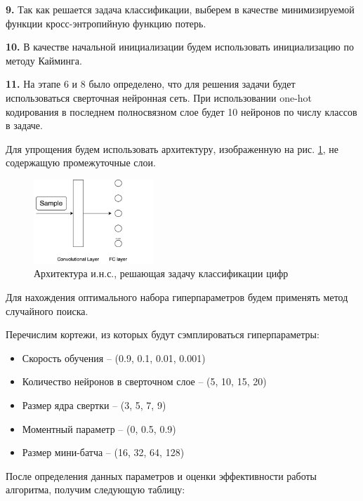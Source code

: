 				\textbf{9.} Так как решается задача классификации, выберем в качестве минимизируемой функции кросс-энтропийную функцию потерь.
				
				\textbf{10.} В качестве начальной инициализации будем использовать инициализацию по методу Кайминга.
				
				\textbf{11.} На этапе 6 и 8 было определено, что для решения задачи будет использоваться сверточная нейронная сеть. При использовании one-hot кодирования в последнем полносвязном слое будет 10 нейронов по числу классов в задаче.
				
				Для упрощения будем использовать архитектуру, изображенную на рис. \ref{fig:model}, не содержащую промежуточные слои.
				
				\begin{figure}[h]
					\centering
					\includegraphics[width=0.4\textwidth]{figures/model.png}
					\caption{Архитектура и.н.с., решающая задачу классификации цифр}
					\label{fig:model}
				\end{figure}
				
				Для нахождения оптимального набора гиперпараметров будем применять метод случайного поиска.
				
				Перечислим кортежи, из которых будут сэмплироваться гиперпараметры:
				\begin{itemize}
					\item Скорость обучения -- (0.9, 0.1, 0.01, 0.001)
					\item Количество нейронов в сверточном слое -- (5, 10, 15, 20)
					\item Размер ядра свертки -- (3, 5, 7, 9)
					\item Моментный параметр -- (0, 0.5, 0.9)
					\item Размер мини-батча -- (16, 32, 64, 128)
				\end{itemize}
				
				После определения данных параметров и оценки эффективности работы алгоритма, получим следующую таблицу:
				
